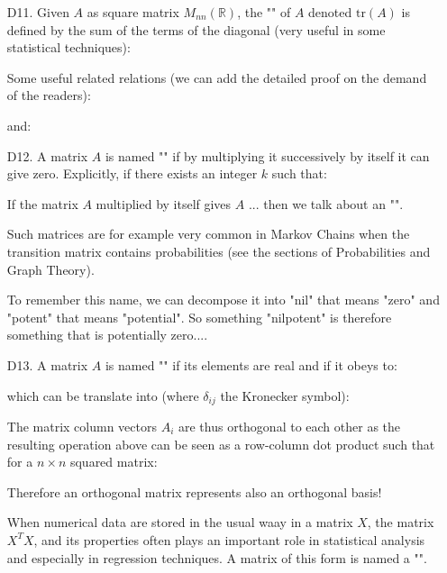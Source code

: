 \begin{enumerate}
		
		\item[D11.] Given $A$ as square matrix $M_{nn}(\mathbb{R})$, the "" of $A$ denoted $\text{tr}(A)$ is defined by the sum of the terms of the diagonal (very useful in some statistical techniques):
		
		Some useful related relations (we can add the detailed proof on the demand of the readers):
		
		and:
		

		\item[D12.] A matrix $A$ is named "" if by multiplying it successively by itself it can give zero. Explicitly, if there exists an integer $k$ such that:
		
		If the matrix $A$ multiplied by itself gives $A$ ... then we talk about an "".
		
		Such matrices are for example very common in Markov Chains when the transition matrix contains probabilities (see the sections of Probabilities and Graph Theory).
		\begin{tcolorbox}[title=Remark,colframe=black,arc=10pt]
		To remember this name, we can decompose it into "nil" that means "zero" and "potent" that means "potential". So something "nilpotent" is therefore something that is potentially zero....
		\end{tcolorbox}
		
		\item[D13.] A matrix $A$ is named "\label{orthogonal matrix}" if its elements are real and if it obeys to:
		
		which can be translate into (where $\delta_{ij}$ the Kronecker symbol):
		
		The matrix column vectors $A_i$ are thus orthogonal to each other as the resulting operation above can be seen as a row-column dot product such that for a $n\times n$ squared matrix:
		
		Therefore an orthogonal matrix represents also an orthogonal basis!
		
		\begin{tcolorbox}[title=Remarks,colframe=black,arc=10pt]
		When numerical data are stored in the usual waay in a matrix $X$, the matrix $X^TX$, and its properties often plays an important role in statistical analysis and especially in regression techniques. A matrix of this form is named a "".
		\end{tcolorbox}
		

\end{enumerate}
